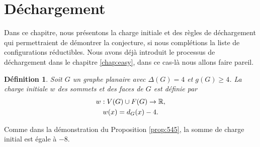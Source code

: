 \documentclass[10pt,a4paper]{article}
\newtheorem{definition}{Définition}
\newtheorem{theorem}{Théorème}
\begin{document}
%
%
%



\section{Déchargement}
\label{chap:Dec}
Dans ce chapitre, nous présentons la charge initiale et des règles de déchargement qui permettraient de démontrer la conjecture, si nous complétions la liste de configurations réductibles.
Nous avons déjà introduit le processus de déchargement dans le chapitre \ref{chap:easy}, dans ce cas-là nous allons faire pareil.

\begin{definition}
Soit $G$ un graphe planaire avec $\Delta(G)=4$ et $g(G)\ge 4$.
La charge initiale $w$ des sommets et des faces de $G$ est définie par
$$
\gathered
w: V(G)\cup F(G) \to \mathbb{R}, \\
w(x) = d_G(x) - 4. \\
\endgathered
$$
\end{definition}

Comme dans la démonstration du Proposition \ref{prop:545}, la somme de charge initial est égale à $-8$.
\end{document}
